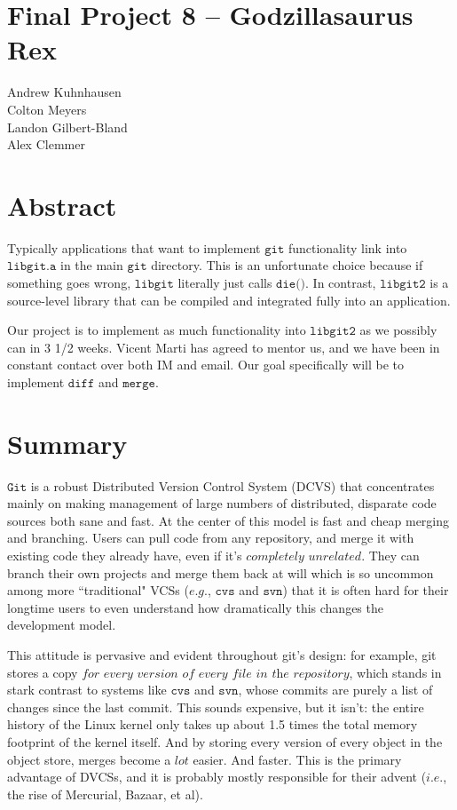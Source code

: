 \documentclass[a4paper]{article}
\begin{document}
\section*{Final Project 8 -- Godzillasaurus Rex}
Andrew Kuhnhausen \\
Colton Meyers \\
Landon Gilbert-Bland \\
Alex Clemmer \\

\section*{Abstract}

Typically applications that want to implement $\texttt{git}$ functionality link into $\texttt{libgit.a}$ in the main $\texttt{git}$ directory. This is an unfortunate choice because if something goes wrong, $\texttt{libgit}$ literally just calls $\texttt{die()}$. In contrast, $\texttt{libgit2}$ is a source-level library that can be compiled and integrated fully into an application.

Our project is to implement as much functionality into $\texttt{libgit2}$ as we possibly can in 3 1/2 weeks. Vicent Marti has agreed to mentor us, and we have been in constant contact over both IM and email. Our goal specifically will be to implement $\texttt{diff}$ and $\texttt{merge}$.

\pagebreak

\section{Summary}

$\texttt{Git}$ is a robust Distributed Version Control System (DCVS) that concentrates mainly on making management of large numbers of distributed, disparate code sources both sane and fast. At the center of this model is fast and cheap merging and branching. Users can pull code from any repository, and merge it with existing code they already have, even if it's $\textit{completely unrelated}$. They can branch their own projects and merge them back at will which is so uncommon among more ``traditional" VCSs ($\textit{e.g.}$, $\texttt{cvs}$ and $\texttt{svn}$) that it is often hard for their longtime users to even understand how dramatically this changes the development model.

This attitude is pervasive and evident throughout git's design: for example, git stores a copy $\textit{for}$ $\textit{every}$ $\textit{version}$ $\textit{of}$ $\textit{every}$ $\textit{file}$ $\textit{in}$ $\textit{the}$ $\textit{repository}$, which stands in stark contrast to systems like $\texttt{cvs}$ and $\texttt{svn}$, whose commits are purely a list of changes since the last commit. This sounds expensive, but it isn't: the entire history of the Linux kernel only takes up about 1.5 times the total memory footprint of the kernel itself. And by storing every version of every object in the object store, merges become a $\textit{lot}$ easier. And faster. This is the primary advantage of DVCSs, and it is probably mostly responsible for their advent ($\textit{i.e.}$, the rise of Mercurial, Bazaar, et al).
\end{document}
